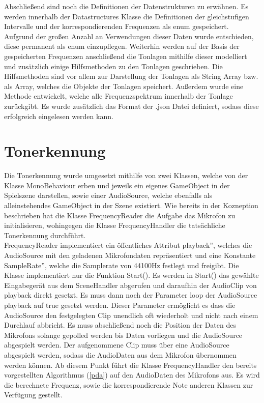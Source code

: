 Abschließend sind noch die Definitionen der Datenstrukturen zu erwähnen. Es werden innerhalb der Datastructures Klasse die Definitionen der gleichstufigen Intervalle und der korrespondierenden Frequenzen als enum gespeichert. Aufgrund der großen Anzahl an Verwendungen dieser Daten wurde entschieden, diese permanent als enum einzupflegen. Weiterhin werden auf der Basis der gespeicherten Frequenzen anschließend die Tonlagen mithilfe dieser modelliert und zusätzlich einige Hilfsmethoden zu den Tonlagen geschrieben. Die Hilfsmethoden sind vor allem zur Darstellung der Tonlagen als String Array bzw. als Array, welches die Objekte der Tonlagen speichert. Außerdem wurde eine Methode entwickelt, welche alle Frequenzspektrum innerhalb der Tonlage zurückgibt. Es wurde zusätzlich das Format der .json Datei definiert, sodass diese erfolgreich eingelesen werden kann. 

\section{Tonerkennung}
\label{sec:tonerkennung}
Die Tonerkennung wurde umgesetzt mithilfe von zwei Klassen, welche von der Klasse MonoBehaviour erben und jeweils ein eigenes GameObject in der Spielszene darstellen, sowie einer AudioSource, welche ebenfalls als alleinstehendes GameObject in der Szene existiert. Wie bereits in der Kozneption beschrieben hat die Klasse FrequencyReader die Aufgabe das Mikrofon zu initialisieren, wohingegen die Klasse FrequencyHandler die tatsächliche Tonerkennung durchführt. \\
FrequencyReader implementiert ein öffentliches Attribut \glqq playback'', welches die AudioSource mit den geladenen Mikrofondaten repräsentiert und eine Konstante \glqq SampleRate'', welche die Samplerate von 44100Hz festlegt und freigibt. Die Klasse implementiert nur die Funktion Start(). Es werden in Start() das gewählte Eingabegerät aus dem SceneHandler abgerufen und daraufhin der AudioClip von playback direkt gesetzt. Es muss dann noch der Parameter loop der AudioSource playback auf true gesetzt werden. Dieser Parameter ermöglicht es dass die AudioSource den festgelegten Clip unendlich oft wiederholt und nicht nach einem Durchlauf abbricht. Es muss abschließend noch die Position der Daten des Mikrofons solange gepolled werden bis Daten vorliegen und die AudioSource abgespielt werden. Der aufgenommene Clip muss über eine AudioSource abgespielt werden, sodass die AudioDaten aus dem Mikrofon übernommen werden können. Ab diesem Punkt führt die Klasse FrequencyHandler den bereits vorgestellten Algorithmus (\ref{pda}) auf den AudioDaten des Mikrofons aus. Es wird die berechnete Frequenz, sowie die korrespondierende Note anderen Klassen zur Verfügung gestellt. 

